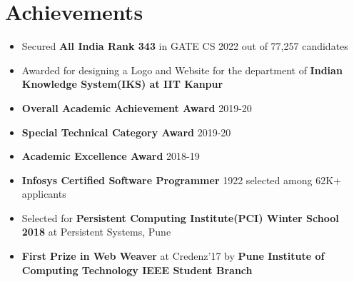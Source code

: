 \documentclass[10.8pt, a4paper]{extarticle}
\newcommand{\shorterSection}[1]{\vspace{-10pt}\section{#1}}
\begin{document}
\shorterSection{Achievements}
\begin{itemize}
  \item Secured \textbf{All India Rank 343} in GATE CS 2022 out of 77,257 candidates\\[-0.6cm]
  \item Awarded for designing a Logo and Website for the department of \textbf{Indian Knowledge System(IKS) at IIT Kanpur}\\[-0.6cm]
  \item \textbf{Overall Academic Achievement Award} 2019-20\\[-0.6cm]
  \item \textbf{Special Technical Category Award} 2019-20\\[-0.6cm]
  \item \textbf{Academic Excellence Award} 2018-19\\[-0.6cm]
  \item \textbf{Infosys Certified Software Programmer} 1922 selected among 62K+ applicants\\[-0.6cm]
  \item Selected for \textbf{Persistent Computing Institute(PCI) Winter School 2018} at Persistent Systems, Pune\\[-0.6cm]
  \item \textbf{First Prize in Web Weaver} at Credenz'17 by \textbf{Pune Institute of Computing Technology IEEE Student Branch}\\[-0.6cm]
\end{itemize}
\end{document}

